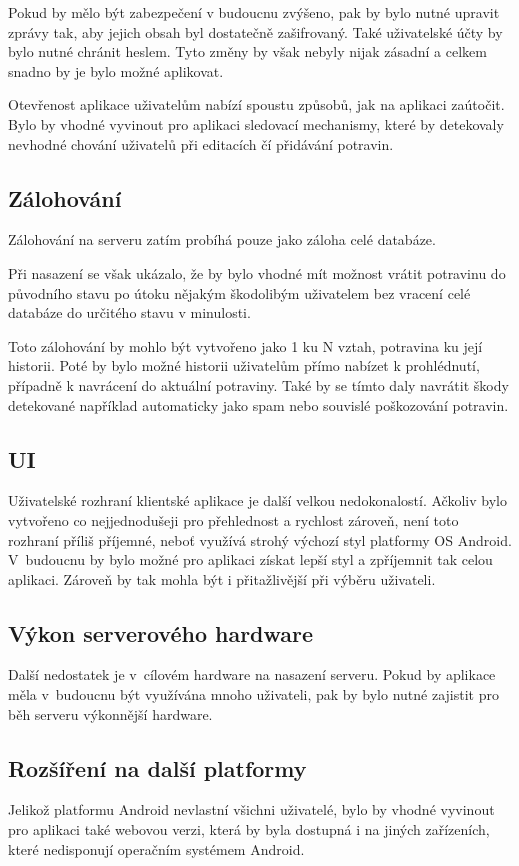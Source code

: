 \documentclass[thesis=B,czech]{FITthesis}[2013/10/20]
\begin{document}
\begin{conclusion}
Pokud by mělo být zabezpečení v budoucnu zvýšeno, pak by bylo nutné upravit zprávy tak, aby jejich obsah byl dostatečně zašifrovaný. Také uživatelské účty by bylo nutné chránit heslem. Tyto změny by však nebyly nijak zásadní a celkem snadno by je bylo možné aplikovat.

Otevřenost aplikace uživatelům nabízí spoustu způsobů, jak na aplikaci zaútočit. Bylo by vhodné vyvinout pro aplikaci sledovací mechanismy, které by detekovaly nevhodné chování uživatelů při editacích čí přidávání potravin.

\subsection{Zálohování}
Zálohování na serveru zatím probíhá pouze jako záloha celé databáze.

Při nasazení se však ukázalo, že by bylo vhodné mít možnost vrátit potravinu do původního stavu po útoku nějakým škodolibým uživatelem bez vracení celé databáze do určitého stavu v minulosti.

Toto zálohování by mohlo být vytvořeno jako 1 ku N vztah, potravina ku její historii. Poté by bylo možné historii uživatelům přímo nabízet k prohlédnutí, případně k navrácení do aktuální potraviny. Také by se tímto daly navrátit škody detekované například automaticky jako spam nebo souvislé poškozování potravin.

\subsection{UI}
Uživatelské rozhraní klientské aplikace je další velkou nedokonalostí. Ačkoliv bylo vytvořeno co nejjednodušeji pro přehlednost a rychlost zároveň, není toto rozhraní příliš příjemné, neboť využívá strohý výchozí styl platformy OS Android. V~budoucnu by bylo možné pro aplikaci získat lepší styl a zpříjemnit tak celou aplikaci. Zároveň by tak mohla být i přitažlivější při výběru uživateli.

\subsection{Výkon serverového hardware}
Další nedostatek je v~cílovém hardware na nasazení serveru. Pokud by aplikace měla v~budoucnu být využívána mnoho uživateli, pak by bylo nutné zajistit pro běh serveru výkonnější hardware.

\subsection{Rozšíření na další platformy}
Jelikož platformu Android nevlastní všichni uživatelé, bylo by vhodné vyvinout pro aplikaci také webovou verzi, která by byla dostupná i na jiných zařízeních, které nedisponují operačním systémem Android.

\end{conclusion}
\end{document}
